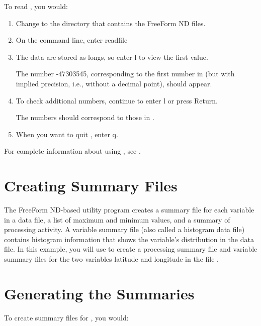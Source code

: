 To read , you would: 

\begin{enumerate}
\item Change to the directory that contains the FreeForm ND files. 

\item On the command line, enter readfile  

\item The data are stored as longs, so enter l to view the first value. 
  
  The number -47303545, corresponding to the first number in
   (but with implied precision, i.e., without a
  decimal point), should appear.

\item To check additional numbers, continue to enter l or press Return. 
  
  The numbers should correspond to those in .

\item When you want to quit , enter q. 
\end{enumerate}

For complete information about using , see
. 

\section{Creating Summary Files}

The FreeForm ND-based utility program  creates a summary
file for each variable in a data file, a list of maximum and minimum
values, and a summary of processing activity. A variable summary file
(also called a histogram data file) contains histogram information
that shows the variable's distribution in the data file. In this
example, you will use  to create a processing summary
file and variable summary files for the two variables latitude and
longitude in the file .

\section{Generating the Summaries}

To create summary files for , you would: 

